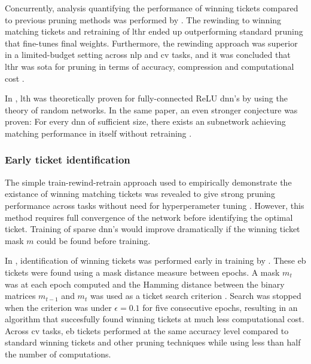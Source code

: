 \documentclass[12pt,fleqn,twocolumn]{article}
\begin{document}
Concurrently, analysis quantifying the performance of winning tickets compared to previous pruning methods was performed by \textcite{Renda2020ComparingRA}.
The rewinding to winning matching tickets and retraining of \acrshort{lthr} ended up outperforming standard pruning that fine-tunes final weights.
Furthermore, the rewinding approach was superior in a limited-budget setting across \acrfull{nlp} and \acrfull{cv} tasks, and it was concluded that \acrshort{lthr} was \acrfull{sota} for pruning in terms of accuracy, compression and computational cost \cite[Chap. 6]{Renda2020ComparingRA} \cite{lange2020lth}.

In \citeyear{Malach2020ProvingTL}, \acrshort{lth} was theoretically proven for fully-connected ReLU \acrshort{dnn}'s by  using the theory of random networks.
In the same paper, an even stronger conjecture was proven:
For every \acrshort{dnn} of sufficient size, there exists an subnetwork achieving matching performance in itself without retraining \cite[Theorem 2.1]{Malach2020ProvingTL}.

\subsubsection*{Early ticket identification}
The simple train-rewind-retrain approach used to empirically demonstrate the existance of winning matching tickets was revealed to give strong pruning performance across tasks without need for hyperperameter tuning \cite[Chap. 6]{Renda2020ComparingRA}.
However, this method requires full convergence of the network before identifying the optimal ticket.
Training of sparse \acrshort{dnn}'s would improve dramatically if the winning ticket mask $m$ could be found before training.

In \citeyear{You2020DrawingET}, identification of winning tickets was performed early in training by \textcite{You2020DrawingET}.
These \acrfull{eb} tickets were found using a mask distance measure between epochs.
A mask $m_t$ was at each epoch computed and the Hamming distance between the binary matrices $m_{t-1}$ and $m_{t}$ was used as a ticket search criterion \cite[Chap. 3.3]{You2020DrawingET}.
Search was stopped when the criterion was under $\epsilon = 0.1$ for five consecutive epochs, resulting in an algorithm that succesfully found winning tickets at much less computational cost.
Across \acrshort{cv} tasks, \acrshort{eb} tickets performed at the same accuracy level compared to standard winning tickets and other pruning techniques while using less than half the number of computations.
\end{document}
